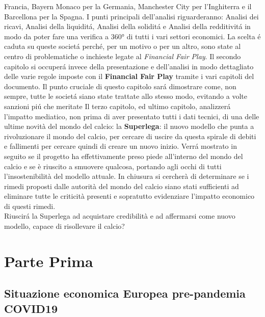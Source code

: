 \documentclass[
    corpo=12pt,
    oneside,
    evenboxes,
    tipotesi=triennale,
    stile=classica,
    oldstyle,
    autoretitolo,
    greek,
]{toptesi}
\begin{document}
\begin{interlinea}{1.5}
Francia, Bayern Monaco per la Germania, Manchester City per l'Inghiterra e il Barcellona per la Spagna. I punti principali dell'analisi riguarderanno: 
Analisi dei ricavi, Analisi della liquidit\'a, Analisi della solidit\'a e Analisi della redditivit\'a in modo da 
poter fare una verifica a 360° di tutti i vari settori economici. La scelta \'e caduta su queste societ\'a perch\'e, per un motivo o per un altro, sono state 
al centro di problematiche o inchieste legate al \emph{Financial Fair Play}.\newline
Il secondo capitolo si occuper\'a invece della presentazione e dell'analisi in modo dettagliato delle varie regole imposte con il
\textbf{Financial Fair Play} tramite i vari capitoli del documento. Il punto cruciale di questo capitolo sar\'a dimostrare come, non sempre, 
tutte le societ\'a siano state trattate allo stesso modo, evitando a volte sanzioni pi\'u che meritate\newline
Il terzo capitolo, ed ultimo capitolo, analizzer\'a l'impatto mediatico, non prima di aver presentato tutti i dati tecnici, di una delle ultime novità 
del mondo del calcio: la \textbf{Superlega}: il nuovo modello che punta a rivoluzionare il mondo del calcio, per cercare di uscire da questa spirale di debiti
e fallimenti per cercare quindi di creare un nuovo inizio. Verr\'a mostrato in seguito se il progetto ha effettivamente preso piede all'interno del mondo del calcio 
e se è riuscito a smuovere qualcosa, portando agli occhi di tutti l'insostenibilità del modello attuale.\newline
In chiusura si cercherà di determinare se i rimedi proposti dalle autorità del mondo del calcio siano stati sufficienti ad eliminare tutte le criticità presenti e 
sopratutto evidenziare l'impatto economico di questi rimedi.\\
Riuscir\'a la Superlega ad acquistare credibilità e ad affermarsi come nuovo modello, capace di risollevare il calcio?

\part{Parte Prima}
\chapter{Situazione economica Europea pre-pandemia COVID19}

\end{interlinea}
\end{document}

